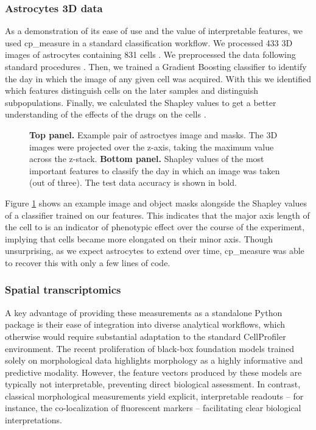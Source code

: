 \documentclass{article}
\begin{document}
\subsubsection{Astrocytes 3D data}
\label{sec:org447090b}

As a demonstration of its ease of use and the value of interpretable features, we used cp\_measure in a standard classification workflow. We processed 433 3D images of astrocytes containing 831 cells \citep{kalinin3DCellNuclear2018}. We preprocessed the data following standard procedures \citep{caicedoDataanalysisStrategiesImagebased2017}. Then, we trained a Gradient Boosting classifier to identify the day in which the image of any given cell was acquired. With this we identified which features distinguish cells on the later samples and distinguish subpopulations. Finally, we calculated the Shapley values to get a better understanding of the effects of the drugs on the cells \citep{sundararajanManyShapleyValues2020}.

\begin{figure}[htbp]
\centering

\caption{\label{fig:astrocytes}\textbf{Top panel.} Example pair of astroctyes image and masks. The 3D images were projected over the z-axis, taking the maximum value across the z-stack. \textbf{Bottom panel.} Shapley values of the most important features to classify the day in which an image was taken (out of three). The test data accuracy is shown in bold.}
\end{figure}

Figure \ref{fig:astrocytes} shows an example image and object masks alongside the Shapley values of a classifier trained on our features. This indicates that the major axis length of the cell to is an indicator of phenotypic effect over the course of the experiment, implying that cells became more elongated on their minor axis. Though unsurprising, as we expect astrocytes to extend over time, cp\_measure was able to recover this with only a few lines of code.
\subsubsection{Spatial transcriptomics}
\label{sec:org5711d86}
A key advantage of providing these measurements as a standalone Python package is their ease of integration into diverse analytical workflows, which otherwise would require substantial adaptation to the standard CellProfiler environment. The recent proliferation of black-box foundation models trained solely on morphological data highlights morphology as a highly informative and predictive modality. However, the feature vectors produced by these models are typically not interpretable, preventing direct biological assessment. In contrast, classical morphological measurements yield explicit, interpretable readouts -- for instance, the co-localization of fluorescent markers -- facilitating clear biological interpretations.
\end{document}
